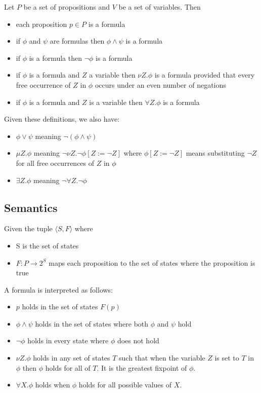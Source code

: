 Let $P$ be a set of propositions and $V$ be a set of variables. Then

\begin{itemize}
    \item each proposition $p \in P$ is a formula
    \item if $\phi$ and $\psi$ are formulas then $\phi \wedge \psi$ is a formula
    \item if $\phi$ is a formula then $\neg \phi$ is a formula
    \item if $\phi$ is a formula and $Z$ a variable then $\nu Z.\phi$ is a formula provided that every free occurrence of $Z$ in $\phi$ occurs under an even number of negations
    \item if $\phi$ is a formula and $Z$ is a variable then $\forall Z. \phi$ is a formula
\end{itemize}

\noindent Given these definitions, we also have:
\begin{itemize}
    \item $\phi \vee \psi$ meaning $\neg (\phi \wedge \psi)$
    \item $\mu Z. \phi$ meaning $\neg \nu Z. \neg \phi [Z := \neg Z]$ where $\phi[Z := \neg Z]$ means substituting $\neg Z$ for all free occurrences of $Z$ in $\phi$
    \item $\exists Z. \phi$ meaning $\neg \forall Z. \neg \phi$
\end{itemize}

\subsection{Semantics}

Given the tuple $\langle S, F \rangle$ where
\begin{itemize}
    \item S is the set of states
    \item $F : P \rightarrow 2^S$ maps each proposition to the set of states where the proposition is true
\end{itemize}

\noindent A \mucalc formula is interpreted as follows:
\begin{itemize}
    \item $p$ holds in the set of states $F(p)$
    \item $\phi \wedge \psi$ holds in the set of states where both $\phi$ and $\psi$ hold
    \item $\neg \phi$ holds in every state where $\phi$ does not hold 
    \item $\nu Z. \phi$ holds in any set of states $T$ such that when the variable $Z$ is set to $T$ in $\phi$ then $\phi$ holds for all of $T$. It is the greatest fixpoint of $\phi$.
    \item $\forall X. \phi$ holds when $\phi$ holds for all possible values of $X$.
\end{itemize}

